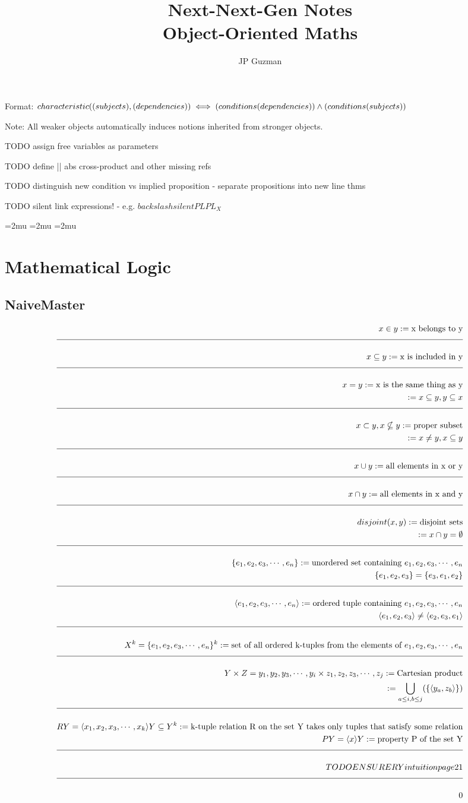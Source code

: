 \documentclass[a4paper]{article}
\title{Next-Next-Gen Notes \\
\large Object-Oriented Maths}
\author{JP Guzman}
\def\ml{\mleft}
\def\mr{\mright}
\newcommand{\uset}[1]{\{#1\}}
\newcommand{\otup}[1]{\langle#1\rangle}
\newcommand{\enlist}[2]{{#1}_{1}, {#1}_{2}, {#1}_{3}, \cdots, {#1}_{#2}}
\newcommand{\n}{\\[1.5ex] \hline \nonumber \\[0ex]}
\newcommand{\m}{\nonumber \\}
\begin{document}
\maketitle
\allowdisplaybreaks

Format: $characteristic\ml(\ml(subjects\mr), \ml(dependencies\mr)\mr) \iff \ml(conditions\ml(dependencies\mr)\mr) \land \ml(conditions\ml(subjects\mr)\mr)$

Note: All weaker objects automatically induces notions inherited from stronger objects.

TODO assign free variables as parameters

TODO define || abs  cross-product and other missing refs

TODO distinguish new condition vs implied proposition
- separate propositions into new line thms

TODO silent link expressions!
- e.g. $backslash silentPL{PL_X}$

\thinmuskip=2mu %
\medmuskip=2mu %
\thickmuskip=2mu %
\setlength{\belowdisplayskip}{0pt} \setlength{\belowdisplayshortskip}{0pt}
\setlength{\abovedisplayskip}{0pt} \setlength{\abovedisplayshortskip}{0pt}


\section{Mathematical Logic}
\subsection{NaiveMaster}
\begin{tcolorbox}
\begin{align}
   x \in y := \text{x belongs to y}
\n x \subseteq y := \text{x is included in y}
\n x = y := \text{x is the same thing as y}
\m := x \subseteq y, y \subseteq x
\n x \subset y, x \nsubseteq y := \text{proper subset}
\m := x \neq y, x \subseteq y
\n x \cup y := \text{all elements in x or y}
\n x \cap y := \text{all elements in x and y}
\n disjoint(x, y) := \text{disjoint sets}
\m := x \cap y = \emptyset
\n \uset{\enlist{e}{n}} := \text{unordered set containing $\enlist{e}{n}$}
\m \uset{e_1, e_2, e_3} = \uset{e_3, e_1, e_2}
\n \otup{\enlist{e}{n}} := \text{ordered tuple containing $\enlist{e}{n}$}
\m \otup{e_1, e_2, e_3} \neq \otup{e_2, e_3, e_1}
\n X^k = \uset{\enlist{e}{n}}^k := \text{set of all ordered k-tuples from the elements of $\enlist{e}{n}$}
\n Y \times Z = \enlist{y}{i} \times \enlist{z}{j} := \text{Cartesian product}
\m := \bigcup_{a \leq i, b \leq j} (\uset{\otup{y_a, z_b}})
\n R Y = \otup{\enlist{x}{k}} Y \subseteq Y^k := \text{k-tuple relation R on the set Y takes only tuples that satisfy some relation}
\m P Y = \otup{x} Y := \text{property P of the set Y}
\n TODO ENSURE R Y intuition page 21
\n 0
\end{align}
\end{tcolorbox}
\end{document}

